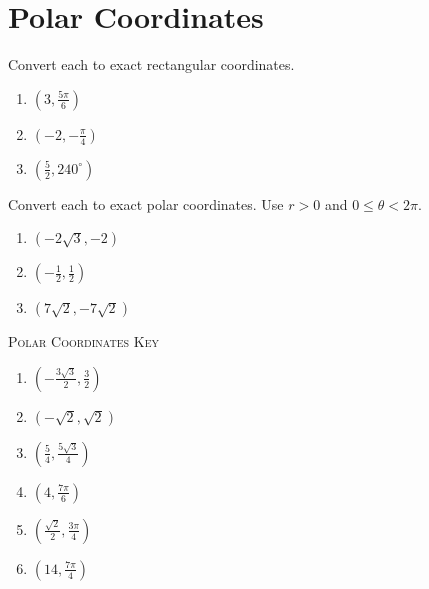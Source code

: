 \chapter{Polar Coordinates}

Convert each to exact rectangular coordinates.
\begin{enumerate}
	\item $\left(3, \frac{5\pi}{6}\right)$
    \item $\left(-2, -\frac{\pi}{4}\right)$
    \item $\left(\frac{5}{2}, 240^\circ\right)$
\end{enumerate}	\setcounter{Review}{\value{enumi}}

Convert each to exact polar coordinates. Use $r > 0$ and $0 \leq \theta < 2\pi$.
\begin{enumerate}		\setcounter{enumi}{\value{Review}}
	\item $\left(-2\sqrt{3}, -2\right)$
    \item $\left(-\frac{1}{2}, \frac{1}{2}\right)$
    \item $\left(7\sqrt{2}, -7\sqrt{2}\right)$
\end{enumerate}	\setcounter{Review}{\value{enumi}}

\newpage

\textsc{Polar Coordinates Key}

\begin{enumerate}
	\item $\left(-\frac{3\sqrt{3}}{2}, \frac{3}{2}\right)$
    \item $(-\sqrt{2}, \sqrt{2})$
    \item $\left(\frac{5}{4}, \frac{5\sqrt{3}}{4}\right)$
    
    \item $\left(4, \frac{7\pi}{6}\right)$
    \item $\left(\frac{\sqrt{2}}{2}, \frac{3\pi}{4}\right)$
    \item $\left(14, \frac{7\pi}{4}\right)$
\end{enumerate}